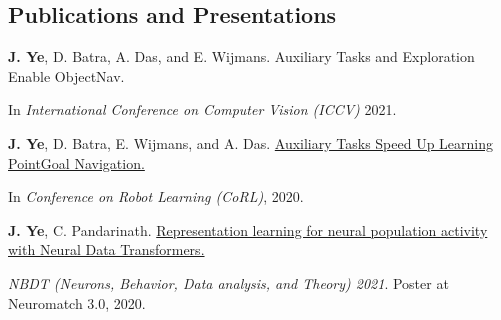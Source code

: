 \subsection*{Publications and Presentations}
    \textbf{J. Ye}, D. Batra, A. Das, and E. Wijmans. Auxiliary Tasks and Exploration Enable ObjectNav.

    In \emph{International Conference on Computer Vision (ICCV)} 2021.

    \textbf{J. Ye}, D. Batra, E. Wijmans, and A. Das.
    \href{https://arxiv.org/abs/2007.04561}
    {Auxiliary Tasks Speed Up Learning PointGoal Navigation.}

    In \emph{Conference on Robot Learning (CoRL)}, 2020.

    \textbf{J. Ye}, C. Pandarinath. \href{https://www.youtube.com/watch?v=lEXSdoIGNWY}
    {Representation learning for neural population activity with Neural Data Transformers.}

    \emph{NBDT (Neurons, Behavior, Data analysis, and Theory) 2021}. Poster at Neuromatch 3.0, 2020.
